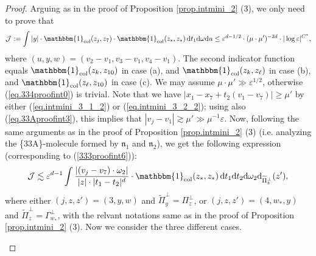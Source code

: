 \documentclass[10pt, reqno]{amsart}
\newcommand {\Jc}{\mathcal J}
\newcommand{\nf}{\mathfrak n}
\theoremstyle{definition}
\theoremstyle{remark}
\numberwithin{equation}{section}
\begin{document}
\begin{proof}
Arguing as in the proof of Proposition \ref{prop.intmini_2} (3), we only need to prove that
\begin{equation}\label{eq.334proofint0}
    \Jc:=\int |y|\cdot\mathbbm{1}_{\mathrm{col}}(z_j,z_7)\cdot\mathbbm{1}_{\mathrm{col}}(z_*,z_*)\,\mathrm{d}t_1\mathrm{d}\omega\mathrm{d}u \le \varepsilon^{d-1/2}\cdot(\mu\cdot\mu')^{-2d}\cdot|\log\varepsilon|^{C^*},
\end{equation} where $(u,y,w)=(v_2-v_1,v_3-v_1,v_4-v_1)$. The second indicator function equals $\mathbbm{1}_{\mathrm{col}}(z_k,z_{10})$ in case (a), and $\mathbbm{1}_{\mathrm{col}}(z_k,z_\ell)$ in case (b), and $\mathbbm{1}_{\mathrm{col}}(z_\ell,z_{10})$ in case (c). We may assume $\mu\cdot\mu'\gg\varepsilon^{1/2}$, otherwise (\ref{eq.334proofint0}) is trivial. Note that we have $|x_1-x_7+t_2(v_1-v_7)|\geq\mu'$ by either (\ref{eq.intmini_3_1_2}) or (\ref{eq.intmini_3_2_2}); using also (\ref{eq.33Aproofint3}), this implies that $|v_j-v_1|\gtrsim\mu'\gg\mu^{-1}\varepsilon$. Now, following the same arguments as in the proof of Proposition \ref{prop.intmini_2} (3) (i.e. analyzing the \{33A\}-molecule formed by $\nf_1$ and $\nf_2$), we get the following expression (corresponding to (\ref{333proofint6})):
\begin{equation}\label{334proofint1}
\Jc\lesssim \varepsilon^{d-1}\int\frac{|(v_j-v_7)\cdot \omega_2|}{|z|\cdot|t_1-t_2|^{d}} \cdot\mathbbm{1}_{\mathrm{col}}(z_*,z_*)\,\mathrm{d}t_1\mathrm{d}t_2 \mathrm{d}\omega_2\mathrm{d}_{\widetilde{\Pi}_{z}^\perp}(z'),
\end{equation} where either $(j,z,z')=(3,y,w)$ and $\widetilde{\Pi}_y^\perp=\Pi_z^\perp$, or $(j,z,z')=(4,w_*,y)$ and $\widetilde{\Pi}_{z}^\perp=\Gamma_{w_*}^\perp$, with the relvant notations same as in the proof of Proposition \ref{prop.intmini_2} (3). Now we consider the three different cases.


\begin{itemize}


\end{itemize}
\end{proof}
\end{document}
